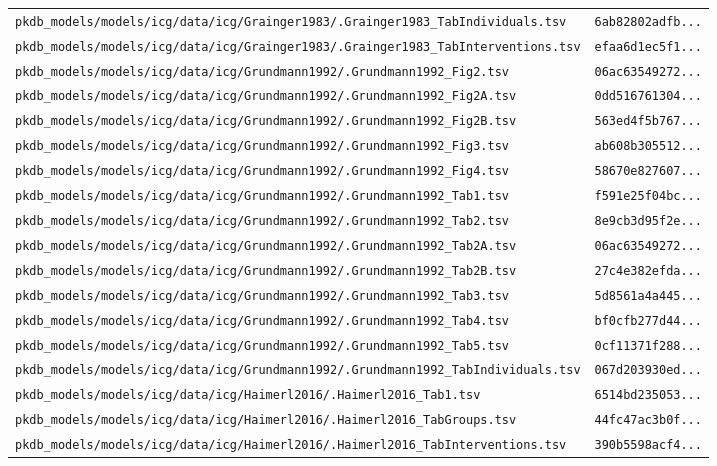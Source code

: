\documentclass{article}
\begin{document}
\begin{longtable}{ll}
\texttt{pkdb\_models/models/icg/data/icg/Grainger1983/.Grainger1983\_TabIndividuals.tsv} & \texttt{6ab82802adfb...} \\
\texttt{pkdb\_models/models/icg/data/icg/Grainger1983/.Grainger1983\_TabInterventions.tsv} & \texttt{efaa6d1ec5f1...} \\
\texttt{pkdb\_models/models/icg/data/icg/Grundmann1992/.Grundmann1992\_Fig2.tsv} & \texttt{06ac63549272...} \\
\texttt{pkdb\_models/models/icg/data/icg/Grundmann1992/.Grundmann1992\_Fig2A.tsv} & \texttt{0dd516761304...} \\
\texttt{pkdb\_models/models/icg/data/icg/Grundmann1992/.Grundmann1992\_Fig2B.tsv} & \texttt{563ed4f5b767...} \\
\texttt{pkdb\_models/models/icg/data/icg/Grundmann1992/.Grundmann1992\_Fig3.tsv} & \texttt{ab608b305512...} \\
\texttt{pkdb\_models/models/icg/data/icg/Grundmann1992/.Grundmann1992\_Fig4.tsv} & \texttt{58670e827607...} \\
\texttt{pkdb\_models/models/icg/data/icg/Grundmann1992/.Grundmann1992\_Tab1.tsv} & \texttt{f591e25f04bc...} \\
\texttt{pkdb\_models/models/icg/data/icg/Grundmann1992/.Grundmann1992\_Tab2.tsv} & \texttt{8e9cb3d95f2e...} \\
\texttt{pkdb\_models/models/icg/data/icg/Grundmann1992/.Grundmann1992\_Tab2A.tsv} & \texttt{06ac63549272...} \\
\texttt{pkdb\_models/models/icg/data/icg/Grundmann1992/.Grundmann1992\_Tab2B.tsv} & \texttt{27c4e382efda...} \\
\texttt{pkdb\_models/models/icg/data/icg/Grundmann1992/.Grundmann1992\_Tab3.tsv} & \texttt{5d8561a4a445...} \\
\texttt{pkdb\_models/models/icg/data/icg/Grundmann1992/.Grundmann1992\_Tab4.tsv} & \texttt{bf0cfb277d44...} \\
\texttt{pkdb\_models/models/icg/data/icg/Grundmann1992/.Grundmann1992\_Tab5.tsv} & \texttt{0cf11371f288...} \\
\texttt{pkdb\_models/models/icg/data/icg/Grundmann1992/.Grundmann1992\_TabIndividuals.tsv} & \texttt{067d203930ed...} \\
\texttt{pkdb\_models/models/icg/data/icg/Haimerl2016/.Haimerl2016\_Tab1.tsv} & \texttt{6514bd235053...} \\
\texttt{pkdb\_models/models/icg/data/icg/Haimerl2016/.Haimerl2016\_TabGroups.tsv} & \texttt{44fc47ac3b0f...} \\
\texttt{pkdb\_models/models/icg/data/icg/Haimerl2016/.Haimerl2016\_TabInterventions.tsv} & \texttt{390b5598acf4...} \\

\end{longtable}
\end{document}
